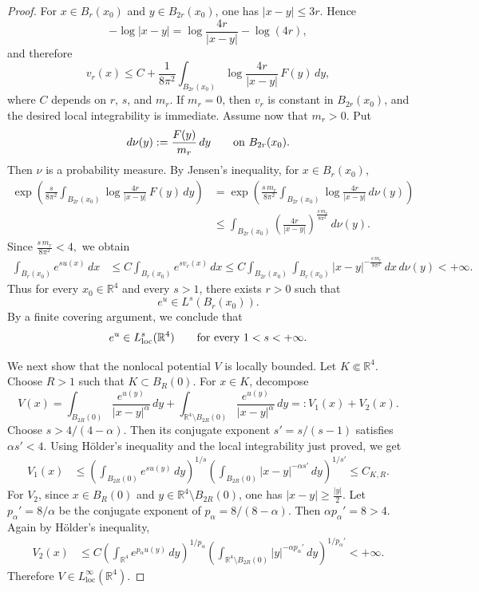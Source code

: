 \documentclass[11pt]{article}
\numberwithin{equation}{section}
\begin{document}
\begin{proof}
For \(x\in B_{r}(x_{0})\) and \(y\in B_{2r}(x_{0})\), one has \(|x-y|\leq 3r\). Hence
\[
-\log |x-y|
=
\log\frac{4r}{|x-y|}-\log(4r),
\]
and therefore
\[
v_{r}(x)
\leq
C
+
\frac{1}{8\pi^{2}}
\int_{B_{2r}(x_{0})}
\log\frac{4r}{|x-y|}\,F(y)\,dy ,
\]
where \(C\) depends on \(r\), \(s\), and \(m_{r}\). If \(m_{r}=0\), then \(v_{r}\) is constant in \(B_{2r}(x_{0})\), and the desired local integrability is immediate. Assume now that \(m_{r}>0\). Put
\[
d\nu(y):=\frac{F(y)}{m_{r}}\,dy
\qquad \hbox{on } B_{2r}(x_{0}).
\]
Then \(\nu\) is a probability measure. By Jensen's inequality, for \(x\in B_{r}(x_{0})\),
\[
\begin{aligned}
\exp\left(
\frac{s}{8\pi^{2}}
\int_{B_{2r}(x_{0})}
\log\frac{4r}{|x-y|}\,F(y)\,dy
\right)
&=
\exp\left(
\frac{s\,m_{r}}{8\pi^{2}}
\int_{B_{2r}(x_{0})}
\log\frac{4r}{|x-y|}\,d\nu(y)
\right)  \\
&\leq
\int_{B_{2r}(x_{0})}
\left(\frac{4r}{|x-y|}\right)^{\frac{s\,m_{r}}{8\pi^{2}}}
\,d\nu(y).
\end{aligned}
\]
Since
$
\frac{s\,m_{r}}{8\pi^{2}}<4,
$
we obtain
\[
\begin{aligned}
\int_{B_{r}(x_{0})}e^{s u(x)}\,dx
&\leq
C
\int_{B_{r}(x_{0})}e^{s v_{r}(x)}\,dx  \leq
C
\int_{B_{2r}(x_{0})}
\int_{B_{r}(x_{0})}
|x-y|^{-\frac{s\,m_{r}}{8\pi^{2}}}
\,dx\,d\nu(y)
<+\infty .
\end{aligned}
\]
Thus for every \(x_{0}\in\mathbb R^{4}\) and every \(s>1\), there exists \(r>0\) such that
\[
e^{u}\in L^{s}(B_{r}(x_{0})).
\]
By a finite covering argument, we conclude that
\[
e^{u}\in L^{s}_{\operatorname{loc}}(\mathbb R^{4})
\qquad \hbox{for every } 1<s<+\infty .
\]

We next show that the nonlocal potential \(V\) is locally bounded. Let \(K\Subset\mathbb R^{4}\). Choose \(R>1\) such that
$
K\subset B_{R}(0).
$
For \(x\in K\), decompose
\[
V(x)
=
\int_{B_{2R}(0)}
\frac{e^{u(y)}}{|x-y|^{\alpha}}\,dy
+
\int_{\mathbb R^{4}\setminus B_{2R}(0)}
\frac{e^{u(y)}}{|x-y|^{\alpha}}\,dy
=:V_{1}(x)+V_{2}(x).
\]
Choose \(s>4/(4-\alpha)\). Then its conjugate exponent \(s'=s/(s-1)\) satisfies
$
\alpha s'<4.
$
Using H\"{o}lder's inequality and the local integrability just proved, we get
\[
\begin{aligned}
V_{1}(x)
&\leq
\left(
\int_{B_{2R}(0)}e^{su(y)}\,dy
\right)^{1/s}
\left(
\int_{B_{2R}(0)}|x-y|^{-\alpha s'}\,dy
\right)^{1/s'} \leq C_{K,R}.
\end{aligned}
\]
For \(V_{2}\), since \(x\in B_{R}(0)\) and \(y\in\mathbb R^{4}\setminus B_{2R}(0)\), one has
$
|x-y|\geq \frac{|y|}{2}.
$
Let \(p_{\alpha}'=8/\alpha\) be the conjugate exponent of \(p_{\alpha}=8/(8-\alpha)\). Then
$
\alpha p_{\alpha}'=8>4.
$
Again by H\"{o}lder's inequality,
\[
\begin{aligned}
V_{2}(x)
&\leq
C
\left(
\int_{\mathbb R^{4}}e^{p_{\alpha}u(y)}\,dy
\right)^{1/p_{\alpha}}
\left(
\int_{\mathbb R^{4}\setminus B_{2R}(0)}
|y|^{-\alpha p_{\alpha}'}\,dy
\right)^{1/p_{\alpha}'}
<+\infty .
\end{aligned}
\]
Therefore
$
V\in L^{\infty}_{\operatorname{loc}}(\mathbb R^{4}).
$


\end{proof}
\end{document}
